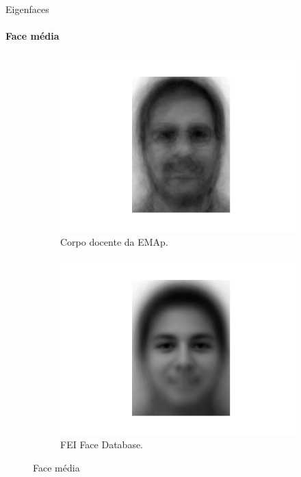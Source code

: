 \documentclass[xcolor=dvipsnames,t,aspectratio=169]{beamer} %
\begin{document}
            
\begin{frame}[c]{Eigenfaces}
\framesubtitle{Face média}

        \hfill
        \begin{figure}[H]
              \begin{subfigure}{0.4\textwidth}
                \centering
                \includegraphics[width=\textwidth]{img/EMAP_0.png}
                \caption{Corpo docente da EMAp.}
                \label{fig:imagem1}
              \end{subfigure}
              \hfill
              \begin{subfigure}{0.4\textwidth}
                \centering
                \includegraphics[width=\textwidth]{img/MAIN_0.png}
                \caption{FEI Face Database.}
                \label{fig:imagem2}
              \end{subfigure}
              \caption{Face média}
            \end{figure}
              \hfill

\end{frame}
\end{document}

